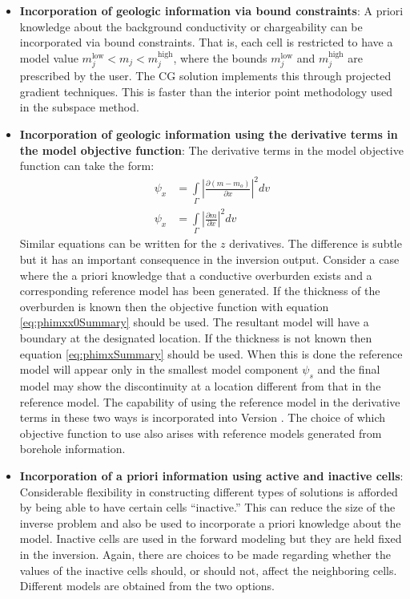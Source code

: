 \begin{itemize}
\item \textbf{Incorporation of geologic information via bound constraints}: A priori knowledge about the background conductivity or chargeability can be incorporated via bound constraints. That is, each cell is restricted to have a model value $m_j^{\mbox{low}} < m_j < m_j^{\mbox{high}}$, where the bounds $m_j^{\mbox{low}}$ and $m_j^{\mbox{high}}$ are prescribed by the user. The CG solution implements this through projected gradient techniques. This is faster than the interior point methodology used in the subspace method.

\item \textbf{Incorporation of geologic information using the derivative terms in the model objective function}: The derivative terms in the model objective function can take the form: \\
\begin{align}
\label{eq:phimxx0Summary}
\psi_x &= \int \limits_\Gamma \left|\frac{\partial(m-m_o)}{\partial x}\right|^2 dv \\
\label{eq:phimxSummary}
\psi_x &= \int \limits_\Gamma \left|\frac{\partial m}{\partial x}\right|^2 dv
\end{align}
%
Similar equations can be written for the $z$ derivatives. The difference is subtle but it has an important consequence in the inversion output. Consider a case where the a priori knowledge that a conductive overburden exists and a corresponding reference model has been generated. If the thickness of the overburden is known then the objective function with equation \ref{eq:phimxx0Summary} should be used. The resultant model will have a boundary at the designated location. If the thickness is not known then equation \ref{eq:phimxSummary} should be used. When this is done the reference model will appear only in the smallest model component $\psi_s$ and the final model may show the discontinuity at a location different from that in the reference model. The capability of using the reference model in the derivative terms in these two ways is incorporated into Version \version. The choice of which objective function to use also arises with reference models generated from borehole information.

\item \textbf{Incorporation of a priori information using active and inactive cells}: Considerable flexibility in constructing different types of solutions is afforded by being able to have certain cells ``inactive.'' This can reduce the size of the inverse problem and also be used to incorporate a priori knowledge about the model. Inactive cells are used in the forward modeling but they are held fixed in the inversion. Again, there are choices to be made regarding whether the values of the inactive cells should, or should not, affect the neighboring cells. Different models are obtained from the two options.


\end{itemize}
